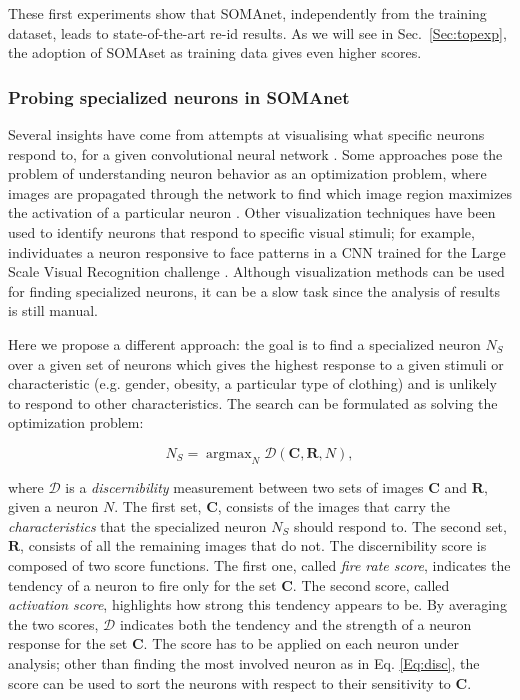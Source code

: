 \documentclass[10pt,journal,letterpaper,compsoc]{IEEEtran}
\DeclareMathOperator*{\argmax}{argmax}
\begin{document}
These first experiments show that SOMAnet, independently from the training dataset, leads to state-of-the-art re-id results. As we will see in Sec.~\ref{Sec:topexp}, the adoption of SOMAset as training data gives even higher scores.



\subsubsection{Probing specialized neurons in SOMAnet}
\label{sec:rgbdid_exp}
\label{sec:probe}

Several insights have come from attempts at visualising what specific neurons respond to, for a given convolutional neural network
\cite{erhanVZ09,SimonyanVZ13,zeilerVZ14}. Some approaches pose the problem of understanding neuron behavior as an optimization problem, where images are propagated through the network  to find  which image region maximizes the activation of a particular neuron \cite{Girshick_2014_CVPR}. Other visualization techniques have been used to identify neurons that respond to specific visual stimuli; for example, \cite{yosinskiVZ15} individuates a neuron responsive to face patterns in a CNN  trained for the Large Scale Visual Recognition challenge \cite{imagenet}. Although visualization methods can be used for finding specialized neurons, it can be a slow task since the analysis of results is still manual.


Here we propose a different  approach: the goal is to find a specialized neuron $N_S$ over a given set of neurons which gives the highest response to a given stimuli or characteristic (e.g. gender, obesity, a particular type of clothing) and is unlikely to respond to other characteristics. The search  can be formulated as solving the optimization problem:

\begin{equation}
  N_S = \argmax_{N} \mathcal{D}(\mathbf{C},\mathbf{R},N),
   \label{Eq:disc}
\end{equation}

where $\mathcal{D}$ is a \emph{discernibility} measurement between two sets of images $\mathbf{C}$ and $\mathbf{R}$, given a neuron $N$. The first set, $\mathbf{C}$, consists of the images that carry the \textit{characteristics} that the specialized neuron $N_S$ should respond to.
The second set, $\mathbf{R}$, consists of all the remaining  images that do not. The discernibility score is composed of two score functions. The first one, called \emph{fire rate score}, indicates the tendency of a neuron to fire only for the set $\mathbf{C}$. The second score, called \emph{activation score}, highlights how strong this tendency appears to be. By averaging the two scores, $\mathcal{D}$ indicates both the tendency and
the strength of a
 neuron response for the set $\mathbf{C}$.
The score has to be applied on each neuron under analysis; other than finding the most involved neuron as in Eq. \ref{Eq:disc}, the score can be used to sort the neurons with respect to their sensitivity to $\mathbf{C}$.
\end{document}
